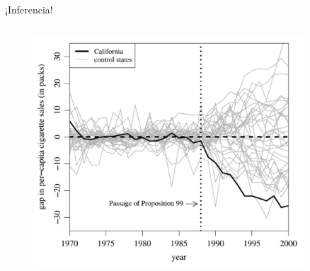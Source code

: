 \documentclass[8pt]{beamer}
\begin{document}
\begin{frame}{¡Inferencia!}
    
\begin{columns}

\begin{column}{0.5\textwidth}
\begin{figure}[H]
    \begin{center}
        \includegraphics[width=0.95\textwidth]{Figuras/sc_adh.pdf}
        \end{center}
\end{figure}
\end{column}

\begin{column}{0.5\textwidth}
\end{column}

\end{columns}
\end{frame}
\end{document}
